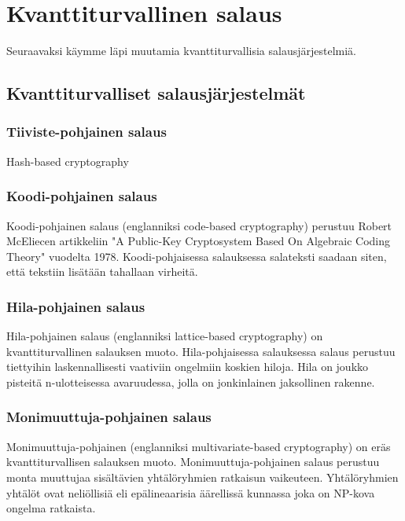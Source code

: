 \chapter{Kvanttiturvallinen salaus\label{results}}
Seuraavaksi käymme läpi muutamia kvanttiturvallisia salausjärjestelmiä.

\section{Kvanttiturvalliset salausjärjestelmät}

\subsection{Tiiviste-pohjainen salaus}
Hash-based cryptography

\subsection{Koodi-pohjainen salaus}
Koodi-pohjainen salaus (englanniksi code-based cryptography) perustuu Robert McEliecen artikkeliin "A Public-Key Cryptosystem Based On Algebraic Coding Theory" vuodelta 1978. Koodi-pohjaisessa salauksessa salateksti saadaan siten, että tekstiin lisätään tahallaan virheitä.

\subsection{Hila-pohjainen salaus}
Hila-pohjainen salaus (englanniksi lattice-based cryptography) on kvanttiturvallinen salauksen muoto. Hila-pohjaisessa salauksessa salaus perustuu tiettyihin laskennallisesti vaativiin ongelmiin koskien hiloja. Hila on joukko pisteitä n-ulotteisessa avaruudessa, jolla on jonkinlainen jaksollinen rakenne.

\subsection{Monimuuttuja-pohjainen salaus}
Monimuuttuja-pohjainen (englanniksi multivariate-based cryptography) on eräs kvanttiturvallisen salauksen muoto. Monimuuttuja-pohjainen salaus perustuu monta muuttujaa sisältävien yhtälöryhmien ratkaisun vaikeuteen. Yhtälöryhmien yhtälöt ovat neliöllisiä eli epälineaarisia äärellissä kunnassa joka on NP-kova ongelma ratkaista. 